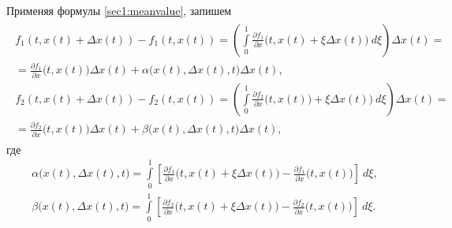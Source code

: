 \documentclass[../main.tex]{subfiles}
\begin{document}
Применяя формулы  \eqref{sec1:meanvalue}, запишем 
\begin{gather*}
\begin{gathered}
    f_1(t, x(t)+\Delta x(t)) - f_1(t, x(t)) = \left(  \int\limits_0^1 \frac{\partial f_1}{\partial x} \Big(t, x(t) + \xi \Delta x(t)\Big) \ d\xi \right) \Delta x(t) =  \\  = \frac{\partial f_1}{\partial x} \Big(t, x(t)\Big)  \Delta x(t) + \alpha\Big(x(t),\Delta x(t), t\Big) \Delta x(t), \\ 
    f_2(t, x(t)+\Delta x(t)) - f_2(t, x(t)) = \left(  \int\limits_0^1 \frac{\partial f_2}{\partial x} \Big(t, x(t)) + \xi \Delta x(t)\Big) \ d\xi \right) \Delta x(t)=  \\  = \frac{\partial f_2}{\partial x} \Big(t, x(t)\Big)  \Delta x(t) + \beta\Big(x(t),\Delta x(t), t\Big) \Delta x(t), 
\end{gathered}
\end{gather*}
где 
\begin{gather*}
    \alpha\Big(x(t),\Delta x(t), t\Big) = 
     \int\limits_0^1 \left[ \frac{\partial f_1}{\partial x} \Big(t, x(t) + \xi \Delta x(t)\Big)  - \frac{\partial f_1}{\partial x} \Big(t, x(t)\Big)  \right] \ d\xi ,\\
    \beta\Big(x(t),\Delta x(t), t\Big) = 
     \int\limits_0^1 \left[ \frac{\partial f_2}{\partial x} \Big(t, x(t) + \xi \Delta x(t)\Big)  - \frac{\partial f_2}{\partial x} \Big(t, x(t)\Big)  \right] \ d\xi.
\end{gather*}
    
\end{document}
